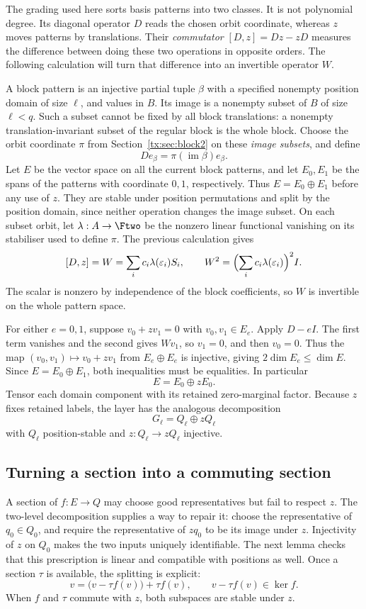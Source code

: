 The grading used here sorts basis patterns into two classes. It is not
polynomial degree. Its diagonal operator $D$ reads the chosen orbit
coordinate, whereas $z$ moves patterns by translations. Their
\emph{commutator} $[D,z]=Dz-zD$ measures the difference between doing
these two operations in opposite orders. The following calculation
will turn that difference into an invertible operator $W$.

A block pattern is an injective partial tuple $\beta$ with a specified nonempty position domain of size $\ell$, and values in $B$. Its image is a nonempty subset of $B$ of size $\ell<q$. Such a subset cannot be fixed by all block translations: a nonempty translation-invariant subset of the regular block is the whole block. Choose the orbit coordinate $\pi$ from Section~\ref{tx:sec:block2} on these \emph{image subsets}, and define
\[
                 D e_\beta=\pi(\operatorname{im}\beta)e_\beta.
\]
Let $E$ be the vector space on all the current block patterns, and let $E_0,E_1$ be the spans of the patterns with coordinate $0,1$, respectively. Thus $E=E_0\oplus E_1$ before any use of $z$. They are stable under position permutations and split by the position domain, since neither operation changes the image subset. On each subset orbit, let $\lambda:A\to\Ftwo$ be the nonzero linear functional vanishing on its stabiliser used to define $\pi$. The previous calculation gives
\[
 [D,z]=W=\sum_i c_i\lambda(\varepsilon_i)S_i,
 \qquad W^2=\Bigl(\sum_i c_i\lambda(\varepsilon_i)\Bigr)^2I.
\]
The scalar is nonzero by independence of the block coefficients, so $W$ is invertible on the whole pattern space.

For either $e=0,1$, suppose $v_0+zv_1=0$ with $v_0,v_1\in E_e$. Apply $D-eI$. The first term vanishes and the second gives $Wv_1$, so $v_1=0$, and then $v_0=0$. Thus the map $(v_0,v_1)\mapsto v_0+zv_1$ from $E_e\oplus E_e$ is injective, giving $2\dim E_e\le\dim E$. Since $E=E_0\oplus E_1$, both inequalities must be equalities. In particular
\[E=E_0\oplus zE_0.
\]
Tensor each domain component with its retained zero-marginal factor. Because $z$ fixes retained labels, the layer has the analogous decomposition
\[G_\ell=Q_\ell\oplus zQ_\ell
\]
with $Q_\ell$ position-stable and $z:Q_\ell\to zQ_\ell$ injective.

\subsection{Turning a section into a commuting section}
A section of $f:E\to Q$ may choose good representatives but fail to
respect $z$. The two-level decomposition supplies a way to repair it:
choose the representative of $q_0\in Q_0$, and require the
representative of $zq_0$ to be its image under $z$. Injectivity of
$z$ on $Q_0$ makes the two inputs uniquely identifiable. The next
lemma checks that this prescription is linear and compatible with
positions as well. Once a section $\tau$ is available, the splitting
is explicit:
\[
             v=\bigl(v-\tau f(v)\bigr)+\tau f(v),
       \qquad v-\tau f(v)\in\ker f.
\]
When $f$ and $\tau$ commute with $z$, both subspaces are stable under $z$.

